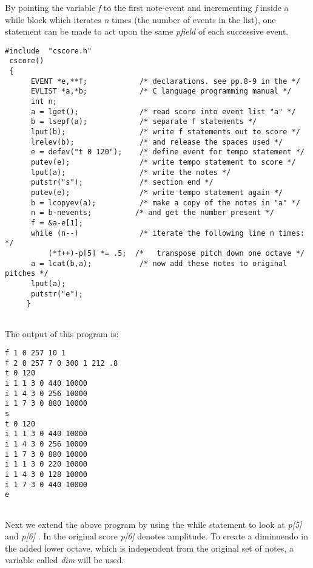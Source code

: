   By pointing the variable\emph{ f}
 to the first note-event and incrementing \emph{f}
 inside a while block which iterates\emph{ n }
times (the number of events in the list), one statement can be made to act upon the same \emph{pfield}
 of each successive event. 


 
\begin{lstlisting}
#include  "cscore.h"
 cscore()
 {
      EVENT *e,**f;            /* declarations. see pp.8-9 in the */ 
      EVLIST *a,*b;            /* C language programming manual */ 
      int n; 
      a = lget();              /* read score into event list "a" */ 
      b = lsepf(a);            /* separate f statements */ 
      lput(b);                 /* write f statements out to score */ 
      lrelev(b);               /* and release the spaces used */ 
      e = defev("t 0 120");    /* define event for tempo statement */ 
      putev(e);                /* write tempo statement to score */ 
      lput(a);                 /* write the notes */ 
      putstr("s");             /* section end */ 
      putev(e);                /* write tempo statement again */ 
      b = lcopyev(a);          /* make a copy of the notes in "a" */ 
      n = b-nevents;          /* and get the number present */ 
      f = &a-e[1]; 
      while (n--)              /* iterate the following line n times: */ 
          (*f++)-p[5] *= .5;  /*   transpose pitch down one octave */ 
      a = lcat(b,a);           /* now add these notes to original pitches */ 
      lput(a); 
      putstr("e");
     }
      
\end{lstlisting}


 
 The output of this program is: 

 
\begin{lstlisting}
f 1 0 257 10 1 
f 2 0 257 7 0 300 1 212 .8 
t 0 120 
i 1 1 3 0 440 10000 
i 1 4 3 0 256 10000 
i 1 7 3 0 880 10000 
s 
t 0 120 
i 1 1 3 0 440 10000 
i 1 4 3 0 256 10000 
i 1 7 3 0 880 10000 
i 1 1 3 0 220 10000 
i 1 4 3 0 128 10000 
i 1 7 3 0 440 10000 
e
      
\end{lstlisting}


 


  Next we extend the above program by using the while statement to look at \emph{p[5]}
 and \emph{p[6]}
. In the original score \emph{p[6]}
 denotes amplitude. To create a diminuendo in the added lower octave, which is independent from the original set of notes, a variable called \emph{dim}
 will be used. 


